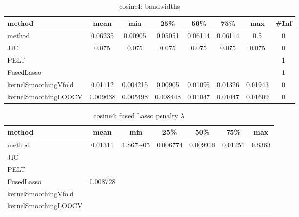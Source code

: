 \begin{table}[ht]
\centering
\begin{tabular}{l|c|ccccc|c}
  \hline
method & mean & min & 25\% & 50\% & 75\% & max & \#Inf \\ 
  \hline
method & 0.06235 & 0.00905 & 0.05051 & 0.06114 & 0.06114 &   0.5 &   0 \\ 
  JIC & 0.075 & 0.075 & 0.075 & 0.075 & 0.075 & 0.075 &   0 \\ 
  PELT &  &  &  &  &  &  &   1 \\ 
  FusedLasso &  &  &  &  &  &  &   1 \\ 
  kernelSmoothingVfold & 0.01112 & 0.004215 & 0.00905 & 0.01095 & 0.01326 & 0.01943 &   0 \\ 
  kernelSmoothingLOOCV & 0.009638 & 0.005498 & 0.008448 & 0.01047 & 0.01047 & 0.01609 &   0 \\ 
   \hline
\end{tabular}
\caption{cosine4: bandwidths} 
\label{tab:cosine4Bandwidths}
\end{table}
\begin{table}[ht]
\centering
\begin{tabular}{l|c|ccccc}
  \hline
method & mean & min & 25\% & 50\% & 75\% & max \\ 
  \hline
method & 0.01311 & 1.867e-05 & 0.006774 & 0.009918 & 0.01251 & 0.8363 \\ 
  JIC &  &  &  &  &  &  \\ 
  PELT &  &  &  &  &  &  \\ 
  FusedLasso & 0.008728 &  &  &  &  &  \\ 
  kernelSmoothingVfold &  &  &  &  &  &  \\ 
  kernelSmoothingLOOCV &  &  &  &  &  &  \\ 
   \hline
\end{tabular}
\caption{cosine4: fused Lasso penalty $\lambda$} 
\label{tab:cosine4Lambdas}
\end{table}
